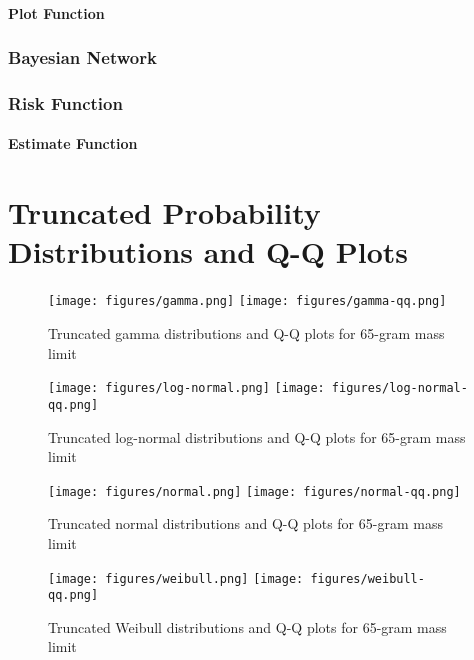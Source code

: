 \subsubsection{Plot Function}
\label{sec:plot}

\pagebreak

\subsection{Bayesian Network}
\label{sec:bn}

\pagebreak

\subsection{Risk Function}
\label{sec:risk}

\pagebreak

\subsubsection{Estimate Function}
\label{sec:estimate}


\chapter{Truncated Probability Distributions and Q-Q Plots}
%
\begin{figure}[!ht]
  \centering
  \texttt{[image: figures/gamma.png]}
  \texttt{[image: figures/gamma-qq.png]}
  \caption{Truncated gamma distributions and Q-Q plots for 65-gram mass limit}
  \label{fig:gamma-qq}
\end{figure}

\begin{figure}
  \centering
  \texttt{[image: figures/log-normal.png]}
  \texttt{[image: figures/log-normal-qq.png]}
  \caption{Truncated log-normal distributions and Q-Q plots for 65-gram mass limit}
  \label{fig:log-normal-qq}
\end{figure}

\begin{figure}
  \centering
  \texttt{[image: figures/normal.png]}
  \texttt{[image: figures/normal-qq.png]}
  \caption{Truncated normal distributions and Q-Q plots for 65-gram mass limit}
  \label{fig:normal-qq}
\end{figure}

\begin{figure}
  \centering
  \texttt{[image: figures/weibull.png]}
  \texttt{[image: figures/weibull-qq.png]}
  \caption{Truncated Weibull distributions and Q-Q plots for 65-gram mass limit}
  \label{fig:weibull-qq}
\end{figure}

